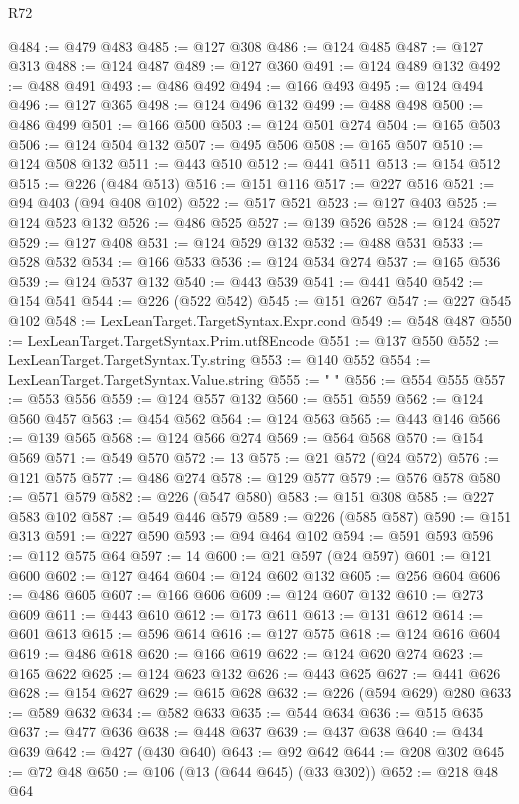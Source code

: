 \begin{lexlean}{R72}
\begin{coremodule}
@484 := @479 @483
@485 := @127 @308
@486 := @124 @485
@487 := @127 @313
@488 := @124 @487
@489 := @127 @360
@491 := @124 @489 @132
@492 := @488 @491
@493 := @486 @492
@494 := @166 @493
@495 := @124 @494
@496 := @127 @365
@498 := @124 @496 @132
@499 := @488 @498
@500 := @486 @499
@501 := @166 @500
@503 := @124 @501 @274
@504 := @165 @503
@506 := @124 @504 @132
@507 := @495 @506
@508 := @165 @507
@510 := @124 @508 @132
@511 := @443 @510
@512 := @441 @511
@513 := @154 @512
@515 := @226 (@484 @513)
@516 := @151 @116
@517 := @227 @516
@521 := @94 @403 (@94 @408 @102)
@522 := @517 @521
@523 := @127 @403
@525 := @124 @523 @132
@526 := @486 @525
@527 := @139 @526
@528 := @124 @527
@529 := @127 @408
@531 := @124 @529 @132
@532 := @488 @531
@533 := @528 @532
@534 := @166 @533
@536 := @124 @534 @274
@537 := @165 @536
@539 := @124 @537 @132
@540 := @443 @539
@541 := @441 @540
@542 := @154 @541
@544 := @226 (@522 @542)
@545 := @151 @267
@547 := @227 @545 @102
@548 := LexLeanTarget.TargetSyntax.Expr.cond
@549 := @548 @487
@550 := LexLeanTarget.TargetSyntax.Prim.utf8Encode
@551 := @137 @550
@552 := LexLeanTarget.TargetSyntax.Ty.string
@553 := @140 @552
@554 := LexLeanTarget.TargetSyntax.Value.string
@555 := " "
@556 := @554 @555
@557 := @553 @556
@559 := @124 @557 @132
@560 := @551 @559
@562 := @124 @560 @457
@563 := @454 @562
@564 := @124 @563
@565 := @443 @146
@566 := @139 @565
@568 := @124 @566 @274
@569 := @564 @568
@570 := @154 @569
@571 := @549 @570
@572 := 13
@575 := @21 @572 (@24 @572)
@576 := @121 @575
@577 := @486 @274
@578 := @129 @577
@579 := @576 @578
@580 := @571 @579
@582 := @226 (@547 @580)
@583 := @151 @308
@585 := @227 @583 @102
@587 := @549 @446 @579
@589 := @226 (@585 @587)
@590 := @151 @313
@591 := @227 @590
@593 := @94 @464 @102
@594 := @591 @593
@596 := @112 @575 @64
@597 := 14
@600 := @21 @597 (@24 @597)
@601 := @121 @600
@602 := @127 @464
@604 := @124 @602 @132
@605 := @256 @604
@606 := @486 @605
@607 := @166 @606
@609 := @124 @607 @132
@610 := @273 @609
@611 := @443 @610
@612 := @173 @611
@613 := @131 @612
@614 := @601 @613
@615 := @596 @614
@616 := @127 @575
@618 := @124 @616 @604
@619 := @486 @618
@620 := @166 @619
@622 := @124 @620 @274
@623 := @165 @622
@625 := @124 @623 @132
@626 := @443 @625
@627 := @441 @626
@628 := @154 @627
@629 := @615 @628
@632 := @226 (@594 @629) @280
@633 := @589 @632
@634 := @582 @633
@635 := @544 @634
@636 := @515 @635
@637 := @477 @636
@638 := @448 @637
@639 := @437 @638
@640 := @434 @639
@642 := @427 (@430 @640)
@643 := @92 @642
@644 := @208 @302
@645 := @72 @48
@650 := @106 (@13 (@644 @645) (@33 @302))
@652 := @218 @48 @64

\end{coremodule}
\end{lexlean}
